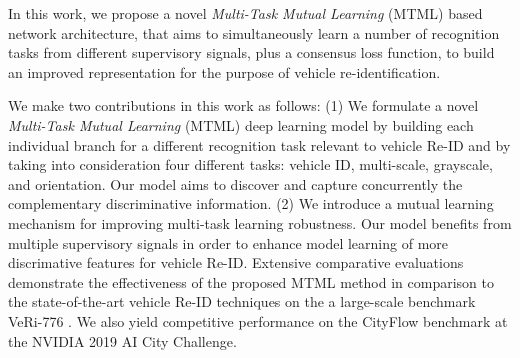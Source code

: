\documentclass[10pt,twocolumn,letterpaper]{article}
\begin{document}

In this work, we propose a novel {\em Multi-Task Mutual Learning}
(MTML) based network architecture,
that aims to simultaneously learn a number of recognition tasks from
different supervisory signals, plus a consensus loss function, to
build an improved representation for the purpose of vehicle
re-identification.

We make two contributions in this work as follows:
(1) We formulate a novel {\em Multi-Task Mutual Learning} (MTML) deep
learning model by building each individual branch for a different
recognition task relevant to vehicle Re-ID and by taking into
consideration four different tasks: vehicle ID, multi-scale, grayscale, and orientation.
Our model aims to discover and capture concurrently the complementary discriminative information.
(2) We introduce a mutual learning mechanism for improving multi-task learning robustness.
Our model benefits from multiple supervisory signals in order to
enhance model learning of more discrimative features for vehicle Re-ID.
Extensive comparative evaluations demonstrate the effectiveness of the
proposed MTML method in comparison to the state-of-the-art vehicle Re-ID techniques on the a large-scale benchmark
VeRi-776 \cite{liu2016veri}.
We also yield competitive performance on the CityFlow
\cite{tang2019cityflow} benchmark at the NVIDIA 2019 AI City Challenge.


\end{document}
